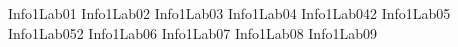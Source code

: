 \documentclass{instrukcja}
\begin{document}
{Info1Lab01}
{Info1Lab02}
{Info1Lab03}
{Info1Lab04}
{Info1Lab042}
{Info1Lab05}
{Info1Lab052}
{Info1Lab06}
{Info1Lab07}
{Info1Lab08}
{Info1Lab09}
\end{document}
